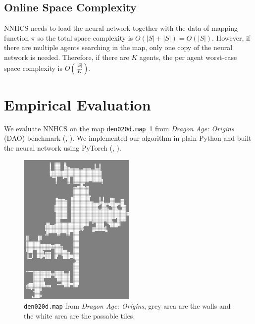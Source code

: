 \documentclass[letterpaper]{article}
\newcommand{\citea}[1]{(\citeauthor{#1}, \citeyear{#1})}
\numberwithin{equation}{section}
\numberwithin{theorem}{section}
\numberwithin{lemma}{section}
\numberwithin{df}{section}
\begin{document}
    \subsection{Online Space Complexity}\label{subsec:online-space-complexity}
    NNHCS needs to load the neural network together with the data of mapping function $\pi$ so the total space complexity is $O(|S| + |S|) = O(|S|)$.
    However, if there are multiple agents searching in the map, only one copy of the neural network is needed.
    Therefore, if there are $K$ agents, the per agent worst-case space complexity is $O(\frac{|S|}{K})$.


    \section{Empirical Evaluation}\label{sec:empirical-evaluation}

    We evaluate NNHCS on the map \texttt{den020d.map}~\ref{fig:map} from \textit{Dragon Age: Origins} (DAO) benchmark \citea{benchmarks}.
    We implemented our algorithm in plain Python and built the neural network using PyTorch \citea{pytorch}.

    \begin{figure}[h]
        \includegraphics[width=0.5\textwidth]{world.png}
        \caption {\small \texttt{den020d.map} from \textit{Dragon Age: Origins}, grey area are the walls and the white area are the passable tiles.}
        \centering
        \label{fig:map}
    \end{figure}
\end{document}
